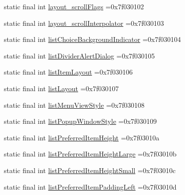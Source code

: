 \begin{DoxyCompactItemize}
\item 
static final int \mbox{\hyperlink{classcom_1_1example_1_1trainawearapplication_1_1_r_1_1attr_a96e28cca2c84297df64b0b8dcef09002}{layout\+\_\+scroll\+Flags}} =0x7f030102
\item 
static final int \mbox{\hyperlink{classcom_1_1example_1_1trainawearapplication_1_1_r_1_1attr_a301d219297877fd9fba9237120f62ad6}{layout\+\_\+scroll\+Interpolator}} =0x7f030103
\item 
static final int \mbox{\hyperlink{classcom_1_1example_1_1trainawearapplication_1_1_r_1_1attr_ab882a1b0a8a047b58a4e3b7ca2a4b4c6}{list\+Choice\+Background\+Indicator}} =0x7f030104
\item 
static final int \mbox{\hyperlink{classcom_1_1example_1_1trainawearapplication_1_1_r_1_1attr_a12e5a93ccd5f94529cbbd425a659f804}{list\+Divider\+Alert\+Dialog}} =0x7f030105
\item 
static final int \mbox{\hyperlink{classcom_1_1example_1_1trainawearapplication_1_1_r_1_1attr_a5186e88f3a8d2f47a984b3c4abdf950f}{list\+Item\+Layout}} =0x7f030106
\item 
static final int \mbox{\hyperlink{classcom_1_1example_1_1trainawearapplication_1_1_r_1_1attr_aa0da0cde08a5d41852489f527cc30824}{list\+Layout}} =0x7f030107
\item 
static final int \mbox{\hyperlink{classcom_1_1example_1_1trainawearapplication_1_1_r_1_1attr_a715fc79a00526bee101e986858320b68}{list\+Menu\+View\+Style}} =0x7f030108
\item 
static final int \mbox{\hyperlink{classcom_1_1example_1_1trainawearapplication_1_1_r_1_1attr_ab3e9100201566b9005ed977a07d783ed}{list\+Popup\+Window\+Style}} =0x7f030109
\item 
static final int \mbox{\hyperlink{classcom_1_1example_1_1trainawearapplication_1_1_r_1_1attr_a4462ad7c7732c7e27c9e79e7edadf79b}{list\+Preferred\+Item\+Height}} =0x7f03010a
\item 
static final int \mbox{\hyperlink{classcom_1_1example_1_1trainawearapplication_1_1_r_1_1attr_a1d042800aa57219351e0eaada5833ef4}{list\+Preferred\+Item\+Height\+Large}} =0x7f03010b
\item 
static final int \mbox{\hyperlink{classcom_1_1example_1_1trainawearapplication_1_1_r_1_1attr_a98188019936b3cd23163b19d8bae3a55}{list\+Preferred\+Item\+Height\+Small}} =0x7f03010c
\item 
static final int \mbox{\hyperlink{classcom_1_1example_1_1trainawearapplication_1_1_r_1_1attr_adb22c37aad7960e0fe9b86037f396779}{list\+Preferred\+Item\+Padding\+Left}} =0x7f03010d

\end{DoxyCompactItemize}

